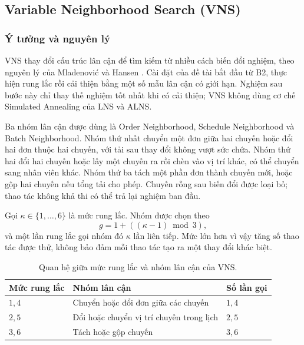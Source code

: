 \subsection[Variable Neighborhood Search]{Variable Neighborhood Search (VNS)}

\subsubsection{Ý tưởng và nguyên lý}
VNS thay đổi cấu trúc lân cận để tìm kiếm từ nhiều cách biến đổi nghiệm, theo nguyên lý của Mladenović và Hansen \cite{mladenovic1997}. Cài đặt của đề tài bắt đầu từ B2, thực hiện rung lắc rồi cải thiện bằng một số mẫu lân cận có giới hạn. Nghiệm sau bước này chỉ thay thế nghiệm tốt nhất khi có cải thiện; VNS không dùng cơ chế Simulated Annealing của LNS và ALNS.

Ba nhóm lân cận được dùng là Order Neighborhood, Schedule Neighborhood và Batch Neighborhood. Nhóm thứ nhất chuyển một đơn giữa hai chuyến hoặc đổi hai đơn thuộc hai chuyến, với tải sau thay đổi không vượt sức chứa. Nhóm thứ hai đổi hai chuyến hoặc lấy một chuyến ra rồi chèn vào vị trí khác, có thể chuyển sang nhân viên khác. Nhóm thứ ba tách một phần đơn thành chuyến mới, hoặc gộp hai chuyến nếu tổng tải cho phép. Chuyến rỗng sau biến đổi được loại bỏ; thao tác không khả thi có thể trả lại nghiệm ban đầu.

Gọi $\kappa\in\{1,\ldots,6\}$ là mức rung lắc. Nhóm được chọn theo
\begin{equation}
 g=1+((\kappa-1)\bmod3),\label{eq:vns-shaking-group}
\end{equation}
và một lần rung lắc gọi nhóm đó $\kappa$ lần liên tiếp. Mức lớn hơn vì vậy tăng số thao tác được thử, không bảo đảm mỗi thao tác tạo ra một thay đổi khác biệt.

\begin{table}[H]
\centering\small
\begin{tabularx}{\linewidth}{lXl}
\toprule
Mức rung lắc & Nhóm lân cận & Số lần gọi \\
\midrule
$1,4$ & Chuyển hoặc đổi đơn giữa các chuyến & $1,4$ \\
$2,5$ & Đổi hoặc chuyển vị trí chuyến trong lịch & $2,5$ \\
$3,6$ & Tách hoặc gộp chuyến & $3,6$ \\
\bottomrule
\end{tabularx}
\caption{Quan hệ giữa mức rung lắc và nhóm lân cận của VNS.}\label{tab:vns-neighborhoods}
\end{table}

